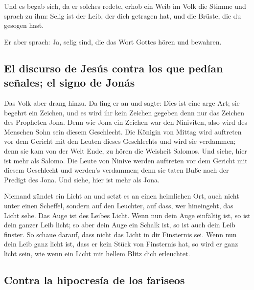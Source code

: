  Und es begab sich, da er solches redete, erhob ein Weib
im Volk die Stimme und sprach zu ihm: Selig ist der Leib, der dich
getragen hat, und die Brüste, die du gesogen hast.

 Er aber sprach: Ja, selig sind, die das Wort Gottes
hören und bewahren.

\hypertarget{el-discurso-de-jesuxfas-contra-los-que-peduxedan-seuxf1ales-el-signo-de-jonuxe1s}{%
\subsection{El discurso de Jesús contra los que pedían señales; el signo
de
Jonás}\label{el-discurso-de-jesuxfas-contra-los-que-peduxedan-seuxf1ales-el-signo-de-jonuxe1s}}

 Das Volk aber drang hinzu. Da fing er an und sagte: Dies
ist eine arge Art; sie begehrt ein Zeichen, und es wird ihr kein Zeichen
gegeben denn nur das Zeichen des Propheten Jona.  Denn
wie Jona ein Zeichen war den Niniviten, also wird des Menschen Sohn sein
diesem Geschlecht.  Die Königin von Mittag wird auftreten
vor dem Gericht mit den Leuten dieses Geschlechts und wird sie
verdammen; denn sie kam von der Welt Ende, zu hören die Weisheit
Salomos. Und siehe, hier ist mehr als Salomo.  Die Leute
von Ninive werden auftreten vor dem Gericht mit diesem Geschlecht und
werden's verdammen; denn sie taten Buße nach der Predigt des Jona. Und
siehe, hier ist mehr als Jona.

 Niemand zündet ein Licht an und setzt es an einen
heimlichen Ort, auch nicht unter einen Scheffel, sondern auf den
Leuchter, auf dass, wer hineingeht, das Licht sehe.  Das
Auge ist des Leibes Licht. Wenn nun dein Auge einfältig ist, so ist dein
ganzer Leib licht; so aber dein Auge ein Schalk ist, so ist auch dein
Leib finster.  So schaue darauf, dass nicht das Licht in
dir Finsternis sei.  Wenn nun dein Leib ganz licht ist,
dass er kein Stück von Finsternis hat, so wird er ganz licht sein, wie
wenn ein Licht mit hellem Blitz dich erleuchtet.

\hypertarget{contra-la-hipocresuxeda-de-los-fariseos}{%
\subsection{Contra la hipocresía de los
fariseos}\label{contra-la-hipocresuxeda-de-los-fariseos}}

